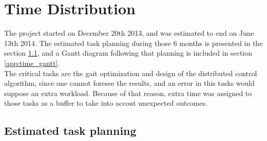 \chapter{Time Distribution}
\label{app:time_distribution}

The project started on December 20th 2013, and was estimated to end on June 13th 2014. The estimated task planning during those 6 months is presented in the section \ref{app:time_tasks}, and a Gantt diagram following that planning is included in section \ref{app:time_gantt}.\\

The critical tasks are the gait optimization and design of the distributed control algorithm, since one cannot foresee the results, and an error in this tasks would suppose an extra workload. Because of that reason, extra time was assigned to those tasks as a buffer to take into accout unexpected outcomes.

\section{Estimated task planning}
\label{app:time_tasks}

